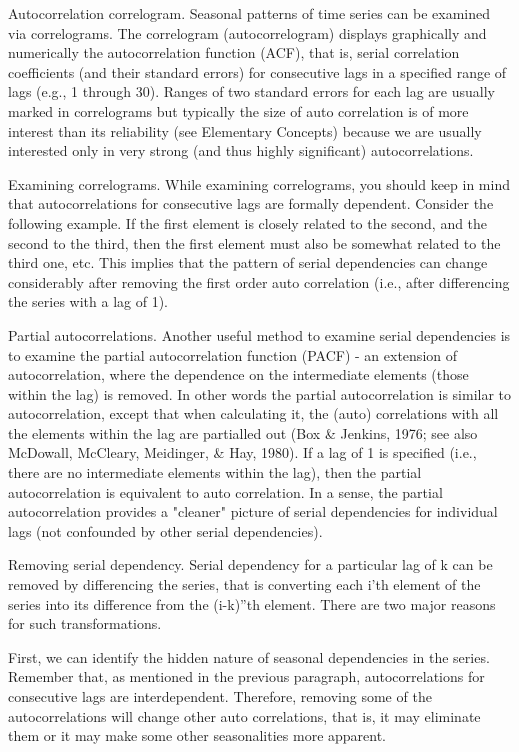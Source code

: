 Autocorrelation correlogram. Seasonal patterns of time series can be examined via correlograms. The correlogram (autocorrelogram) displays graphically and numerically the autocorrelation function (ACF), that is, serial correlation coefficients (and their standard errors) for consecutive lags in a specified range of lags (e.g., 1 through 30). Ranges of two standard errors for each lag are usually marked in correlograms but typically the size of auto correlation is of more interest than its reliability (see Elementary Concepts) because we are usually interested only in very strong (and thus highly significant) autocorrelations.

Examining correlograms. While examining correlograms, you should keep in mind that autocorrelations for consecutive lags are formally dependent. Consider the following example. If the first element is closely related to the second, and the second to the third, then the first element must also be somewhat related to the third one, etc. This implies that the pattern of serial dependencies can change considerably after removing the first order auto correlation (i.e., after differencing the series with a lag of 1).



Partial autocorrelations. Another useful method to examine serial dependencies is to examine the partial autocorrelation function (PACF) - an extension of autocorrelation, where the dependence on the intermediate elements (those within the lag) is removed. In other words the partial autocorrelation is similar to autocorrelation, except that when calculating it, the (auto) correlations with all the elements within the lag are partialled out (Box & Jenkins, 1976; see also McDowall, McCleary, Meidinger, & Hay, 1980). If a lag of 1 is specified (i.e., there are no intermediate elements within the lag), then the partial autocorrelation is equivalent to auto correlation. In a sense, the partial autocorrelation provides a "cleaner" picture of serial dependencies for individual lags (not confounded by other serial dependencies).

Removing serial dependency. Serial dependency for a particular lag of k can be removed by differencing the series, that is converting each i'th element of the series into its difference from the (i-k)''th element. There are two major reasons for such transformations.

First, we can identify the hidden nature of seasonal dependencies in the series. Remember that, as mentioned in the previous paragraph, autocorrelations for consecutive lags are interdependent. Therefore, removing some of the autocorrelations will change other auto correlations, that is, it may eliminate them or it may make some other seasonalities more apparent.

